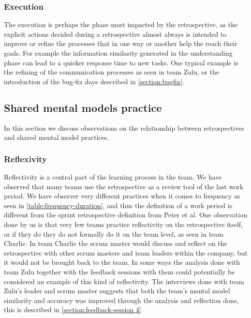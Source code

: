 \subsubsection{Execution}
The execution is perhaps the phase most impacted by the retrospective, as the explicit actions decided during a retrospective almost always is intended to improve or refine the processes that in one way or another help the reach their goals. For example the information similarity generated in the understanding phase can lead to a quicker response time to new tasks. One typical example is the refining of the communication processes as seen in team Zulu, or the introduction of the bug-fix days described in \autoref{section:bugfix}. 


\subsection{Shared mental models practice}
In this section we discuss observations on the relationship between retrospectives and shared mental model practices.


\subsubsection{Reflexivity}
Reflectivity is a central part of the learning process in the team. We have observed that many teams use the retrospective as a review tool of the last work period. We have observer very different practices when it comes to frequency as seen in \autoref{table:frequency-duration}, and thus the definition of a work period is different from the sprint retrospective definition from Peter et al. One observation done by us is that very few teams practice reflectivity on the retrospective itself, or if they do they do not formally do it on the team level, as seen in team Charlie. In team Charlie the scrum master would discuss and reflect on the retrospective with other scrum masters and team leaders within the company, but it would not be brought back to the team. In some ways the analysis done with team Zulu together with the feedback sessions with them could potentially be considered an example of this kind of reflectivity. The interviews done with team Zulu's leader and scrum master suggests that both the team's mental model similarity and accuracy was improved through the analysis and reflection done, this is described in \autoref{section:feedback-session 4}


